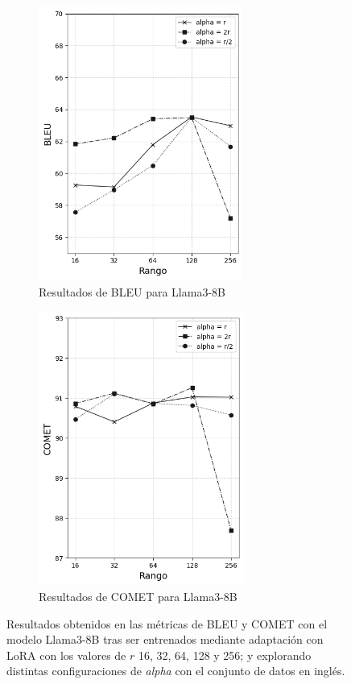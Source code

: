 \documentclass[11pt,spanish,listoffigures,listoftables]{tfgetsinf}
\begin{document}
\begin{figure}
\begin{subfigure}{0.5\textwidth}
\includegraphics[width=0.9\linewidth, height=9cm]{images/llama_BLEU_en_} 
\caption{Resultados de BLEU para Llama3-8B}
\label{fig:subim1}
\end{subfigure}
\begin{subfigure}{0.5\textwidth}
\includegraphics[width=0.9\linewidth, height=9cm]{images/llama_COMET_en_}
\caption{Resultados de COMET para Llama3-8B}
\label{fig:subim2}
\end{subfigure}

\caption{Resultados obtenidos en las métricas de BLEU y COMET con el modelo Llama3-8B tras ser entrenados mediante adaptación con LoRA con los valores de $r$ 16, 32, 64, 128 y 256;  y explorando distintas configuraciones de \textit{alpha} con el conjunto de datos en inglés.}
\label{fig:graficasLlama inglés}
\end{figure}
\end{document}
